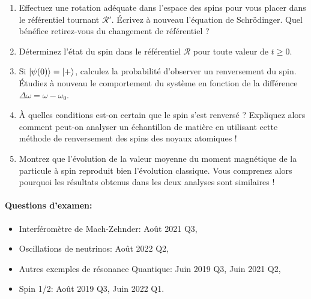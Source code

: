 \begin{enumerate}
\begin{enumerate}
\item Effectuez une rotation adéquate dans l'espace des spins pour vous placer dans le référentiel tournant $\mathcal R'$. Écrivez à nouveau l'équation de Schrödinger. Quel bénéfice retirez-vous du changement de référentiel ?
\item Déterminez l'état du spin dans le référentiel $\mathcal R$ pour toute valeur de $t\geq 0$.
\item Si $\ket{\psi(0)} = \ket{+}$, calculez la probabilité d'observer un renversement du spin. Étudiez à nouveau le comportement du système en fonction de la différence $\Delta\omega = \omega-\omega_0$.
\item À quelles conditions est-on certain que le spin s'est renversé ? Expliquez alors comment peut-on analyser un échantillon de matière en utilisant cette méthode de renversement des spins des noyaux atomiques !
\item Montrez que l'évolution de la valeur moyenne du moment magnétique de la particule à spin reproduit bien l'évolution classique. Vous comprenez alors pourquoi les résultats obtenus dans les deux analyses sont similaires !
\end{enumerate}

\end{enumerate}

\paragraph{Questions d'examen:}
\begin{itemize}[label=\textbullet]
    \item Interféromètre de Mach-Zehnder: Août 2021 Q3,
    \item Oscillations de neutrinos: Août 2022 Q2,
    \item Autres exemples de résonance Quantique: Juin 2019 Q3, Juin 2021 Q2,
    \item Spin 1/2: Août 2019 Q3, Juin 2022 Q1.
\end{itemize}
